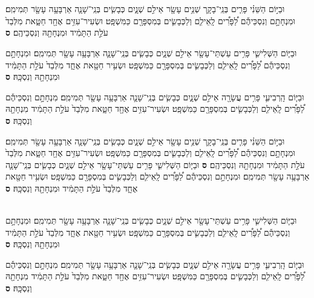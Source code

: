 \documentclass[twoside, openany, parskip=half, 11pt]{book}
\begin{document}
\begin{footnotesize}
\begin{multicols}{2}

\\ 
\\
וּבַיּ֣וֹם הַשֵּׁנִ֗י פָּרִ֧ים בְּנֵֽי־בָקָ֛ר שְׁנֵ֥ים עָשָׂ֖ר אֵילִ֣ם שְׁנָ֑יִם כְּבָשִׂ֧ים בְּנֵֽי־שָׁנָ֛ה אַרְבָּעָ֥ה עָשָׂ֖ר תְּמִימִֽם׃ וּמִנְחָתָ֣ם וְנִסְכֵּיהֶ֡ם לַ֠פָּרִ֠ים לָֽאֵילִ֧ם וְלַכְּבָשִׂ֛ים בְּמִסְפָּרָ֖ם כַּמִּשְׁפָּֽט׃ וּשְׂעִיר־עִזִּ֥ים אֶחָ֖ד חַטָּ֑את מִלְּבַד֙ עֹלַ֣ת הַתָּמִ֔יד וּמִנְחָתָ֖הּ וְנִסְכֵּיהֶֽם׃ \textbf{ס}  

וּבַיּ֧וֹם הַשְּׁלִישִׁ֛י פָּרִ֥ים עַשְׁתֵּי־עָשָׂ֖ר אֵילִ֣ם שְׁנָ֑יִם כְּבָשִׂ֧ים בְּנֵֽי־שָׁנָ֛ה אַרְבָּעָ֥ה עָשָׂ֖ר תְּמִימִֽם׃ וּמִנְחָתָ֣ם וְנִסְכֵּיהֶ֡ם לַ֠פָּרִ֠ים לָֽאֵילִ֧ם וְלַכְּבָשִׂ֛ים בְּמִסְפָּרָ֖ם כַּמִּשְׁפָּֽט׃ וּשְׂעִ֥יר חַטָּ֖את אֶחָ֑ד מִלְּבַד֙ עֹלַ֣ת הַתָּמִ֔יד וּמִנְחָתָ֖הּ וְנִסְכָּֽהּ׃ \textbf{ס} 

וּבַיּ֧וֹם הָֽרְבִיעִ֛י פָּרִ֥ים עֲשָׂרָ֖ה אֵילִ֣ם שְׁנָ֑יִם כְּבָשִׂ֧ים בְּנֵֽי־שָׁנָ֛ה אַרְבָּעָ֥ה עָשָׂ֖ר תְּמִימִֽם׃ מִנְחָתָ֣ם וְנִסְכֵּיהֶ֡ם לַ֠פָּרִ֠ים לָֽאֵילִ֧ם וְלַכְּבָשִׂ֛ים בְּמִסְפָּרָ֖ם כַּמִּשְׁפָּֽט׃ וּשְׂעִיר־עִזִּ֥ים אֶחָ֖ד חַטָּ֑את מִלְּבַד֙ עֹלַ֣ת הַתָּמִ֔יד מִנְחָתָ֖הּ וְנִסְכָּֽהּ׃ \textbf{ס} 

וּבַיּ֣וֹם הַשֵּׁנִ֗י פָּרִ֧ים בְּנֵֽי־בָקָ֛ר שְׁנֵ֥ים עָשָׂ֖ר אֵילִ֣ם שְׁנָ֑יִם כְּבָשִׂ֧ים בְּנֵֽי־שָׁנָ֛ה אַרְבָּעָ֥ה עָשָׂ֖ר תְּמִימִֽם׃ וּמִנְחָתָ֣ם וְנִסְכֵּיהֶ֡ם לַ֠פָּרִ֠ים לָֽאֵילִ֧ם וְלַכְּבָשִׂ֛ים בְּמִסְפָּרָ֖ם כַּמִּשְׁפָּֽט׃ וּשְׂעִיר־עִזִּ֥ים אֶחָ֖ד חַטָּ֑את מִלְּבַד֙ עֹלַ֣ת הַתָּמִ֔יד וּמִנְחָתָ֖הּ וְנִסְכֵּיהֶֽם׃ \textbf{ס}  
וּבַיּ֧וֹם הַשְּׁלִישִׁ֛י פָּרִ֥ים עַשְׁתֵּי־עָשָׂ֖ר אֵילִ֣ם שְׁנָ֑יִם כְּבָשִׂ֧ים בְּנֵֽי־שָׁנָ֛ה אַרְבָּעָ֥ה עָשָׂ֖ר תְּמִימִֽם׃ וּמִנְחָתָ֣ם וְנִסְכֵּיהֶ֡ם לַ֠פָּרִ֠ים לָֽאֵילִ֧ם וְלַכְּבָשִׂ֛ים בְּמִסְפָּרָ֖ם כַּמִּשְׁפָּֽט׃ וּשְׂעִ֥יר חַטָּ֖את אֶחָ֑ד מִלְּבַד֙ עֹלַ֣ת הַתָּמִ֔יד וּמִנְחָתָ֖הּ וְנִסְכָּֽהּ׃ \textbf{ס} 

\\
וּבַיּ֧וֹם הַשְּׁלִישִׁ֛י פָּרִ֥ים עַשְׁתֵּי־עָשָׂ֖ר אֵילִ֣ם שְׁנָ֑יִם כְּבָשִׂ֧ים בְּנֵֽי־שָׁנָ֛ה אַרְבָּעָ֥ה עָשָׂ֖ר תְּמִימִֽם׃ וּמִנְחָתָ֣ם וְנִסְכֵּיהֶ֡ם לַ֠פָּרִ֠ים לָֽאֵילִ֧ם וְלַכְּבָשִׂ֛ים בְּמִסְפָּרָ֖ם כַּמִּשְׁפָּֽט׃ וּשְׂעִ֥יר חַטָּ֖את אֶחָ֑ד מִלְּבַד֙ עֹלַ֣ת הַתָּמִ֔יד וּמִנְחָתָ֖הּ וְנִסְכָּֽהּ׃ \textbf{ס} 

וּבַיּ֧וֹם הָֽרְבִיעִ֛י פָּרִ֥ים עֲשָׂרָ֖ה אֵילִ֣ם שְׁנָ֑יִם כְּבָשִׂ֧ים בְּנֵֽי־שָׁנָ֛ה אַרְבָּעָ֥ה עָשָׂ֖ר תְּמִימִֽם׃ מִנְחָתָ֣ם וְנִסְכֵּיהֶ֡ם לַ֠פָּרִ֠ים לָֽאֵילִ֧ם וְלַכְּבָשִׂ֛ים בְּמִסְפָּרָ֖ם כַּמִּשְׁפָּֽט׃ וּשְׂעִיר־עִזִּ֥ים אֶחָ֖ד חַטָּ֑את מִלְּבַד֙ עֹלַ֣ת הַתָּמִ֔יד מִנְחָתָ֖הּ וְנִסְכָּֽהּ׃ \textbf{ס} 


\end{multicols}
\end{footnotesize}
\end{document}
